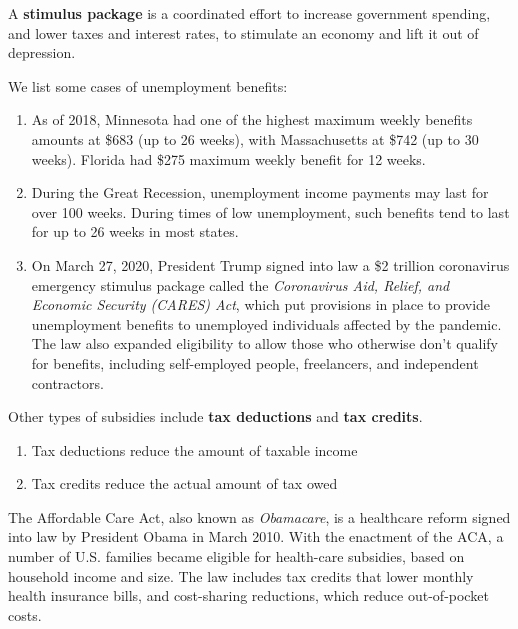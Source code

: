 \documentclass{article}
\begin{document}
      \begin{definition}
        A \textbf{stimulus package} is a coordinated effort to increase government spending, and lower taxes and interest rates, to stimulate an economy and lift it out of depression. 
      \end{definition}

      \begin{example}
        We list some cases of unemployment benefits:
        \begin{enumerate}
          \item As of 2018, Minnesota had one of the highest maximum weekly benefits amounts at \$683 (up to 26 weeks), with Massachusetts at \$742 (up to 30 weeks). Florida had \$275 maximum weekly benefit for 12 weeks. 
          \item During the Great Recession, unemployment income payments may last for over 100 weeks. During times of low unemployment, such benefits tend to last for up to 26 weeks in most states. 
          \item On March 27, 2020, President Trump signed into law a \$2 trillion coronavirus emergency stimulus package called the \textit{Coronavirus Aid, Relief, and Economic Security (CARES) Act}, which put provisions in place to provide unemployment benefits to unemployed individuals affected by the pandemic. The law also expanded eligibility to allow those who otherwise don't qualify for benefits, including self-employed people, freelancers, and independent contractors. 
        \end{enumerate}
      \end{example}

      \begin{definition}
        Other types of subsidies include \textbf{tax deductions} and \textbf{tax credits}. \begin{enumerate}
          \item Tax deductions reduce the amount of taxable income
          \item Tax credits reduce the actual amount of tax owed
        \end{enumerate}
      \end{definition}

      \begin{example}
        The Affordable Care Act, also known as \textit{Obamacare}, is a healthcare reform signed into law by President Obama in March 2010. With the enactment of the ACA, a number of U.S. families became eligible for health-care subsidies, based on household income and size.  The law includes tax credits that lower monthly health insurance bills, and cost-sharing reductions, which reduce out-of-pocket costs. 
      \end{example}
\end{document}
